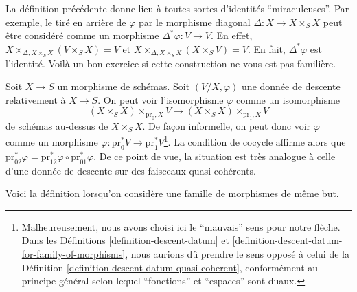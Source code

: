 \noindent
La définition précédente donne lieu à toutes sortes d'identités
``miraculeuses''. Par exemple, le tiré en arrière de $\varphi$ par le
morphisme diagonal $\Delta : X \to X \times_S X$ peut être considéré comme
un morphisme $\Delta^*\varphi : V \to V$.
En effet, $X \times_{\Delta, X \times_S X} (V \times_S X) = V$ et
$X \times_{\Delta, X \times_S X} (X \times_S V) = V$.
En fait, $\Delta^*\varphi$ est l'identité.
Voilà un bon exercice si cette construction ne vous est pas familière.

\begin{remark}
\label{remark-easier}
Soit $X \to S$ un morphisme de schémas. Soit $(V/X, \varphi)$ une donnée
de descente relativement à $X \to S$. On peut voir l'isomorphisme
$\varphi$ comme un isomorphisme
$$
(X \times_S X) \times_{\text{pr}_0, X} V
\longrightarrow
(X \times_S X) \times_{\text{pr}_1, X} V
$$
de schémas au-dessus de $X \times_S X$. De façon informelle, on peut donc
voir $\varphi$ comme un morphisme
$\varphi : \text{pr}_0^*V \to \text{pr}_1^*V$\footnote{Malheureusement,
nous avons choisi ici le ``mauvais'' sens pour notre flèche. Dans les
Définitions \ref{definition-descent-datum} et
\ref{definition-descent-datum-for-family-of-morphisms}, nous aurions dû
prendre le sens opposé à celui de la
Définition \ref{definition-descent-datum-quasi-coherent}, conformément au
principe général selon lequel ``fonctions'' et ``espaces'' sont
duaux.}. La condition de cocycle affirme alors que
$\text{pr}_{02}^*\varphi =
\text{pr}_{12}^*\varphi \circ \text{pr}_{01}^*\varphi$.
De ce point de vue, la situation est très analogue à celle d'une donnée de
descente sur des faisceaux quasi-cohérents.
\end{remark}

\noindent
Voici la définition lorsqu'on considère une famille de morphismes de même but.

